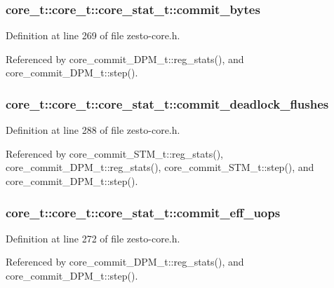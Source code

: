 \subsubsection[{commit\_\-bytes}]{ core\_\-t::core\_\-t::core\_\-stat\_\-t::commit\_\-bytes}\label{structcore__t_1_1core__stat__t_55d2bfdc168268ce43fc373ccd7d3420}




Definition at line 269 of file zesto-core.h.

Referenced by core\_\-commit\_\-DPM\_\-t::reg\_\-stats(), and core\_\-commit\_\-DPM\_\-t::step().
\subsubsection[{commit\_\-deadlock\_\-flushes}]{ core\_\-t::core\_\-t::core\_\-stat\_\-t::commit\_\-deadlock\_\-flushes}\label{structcore__t_1_1core__stat__t_6c0721ecba9c68f18708d4b2fb155285}




Definition at line 288 of file zesto-core.h.

Referenced by core\_\-commit\_\-STM\_\-t::reg\_\-stats(), core\_\-commit\_\-DPM\_\-t::reg\_\-stats(), core\_\-commit\_\-STM\_\-t::step(), and core\_\-commit\_\-DPM\_\-t::step().
\subsubsection[{commit\_\-eff\_\-uops}]{ core\_\-t::core\_\-t::core\_\-stat\_\-t::commit\_\-eff\_\-uops}\label{structcore__t_1_1core__stat__t_b9b59be72d347627a29fff615fee71e6}




Definition at line 272 of file zesto-core.h.

Referenced by core\_\-commit\_\-DPM\_\-t::reg\_\-stats(), and core\_\-commit\_\-DPM\_\-t::step().

